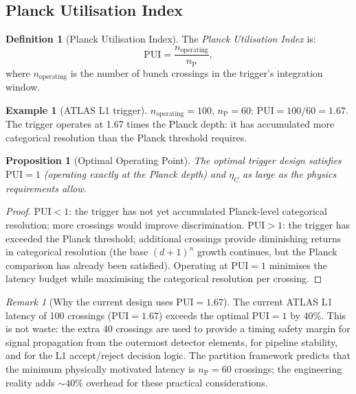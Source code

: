 \documentclass[twocolumn,10pt,a4paper]{article}
\theoremstyle{thmstyle}
\newtheorem{proposition}[theorem]{Proposition}
\theoremstyle{definition}
\newtheorem{definition}[theorem]{Definition}
\newtheorem{example}[theorem]{Example}
\theoremstyle{remark}
\newtheorem{remark}[theorem]{Remark}
\newcommand{\nP}{n_{\mathrm{P}}}
\newcommand{\etaC}{\eta_{C}}
\newcommand{\PUI}{\mathrm{PUI}}
\begin{document}
\subsection{Planck Utilisation Index}

\begin{definition}[Planck Utilisation Index]
\label{def:pui}
The \emph{Planck Utilisation Index} is:
\begin{equation}
\PUI = \frac{n_{\mathrm{operating}}}{\nP},
\label{eq:pui}
\end{equation}
where $n_{\mathrm{operating}}$ is the number of bunch crossings in the
trigger's integration window.
\end{definition}

\begin{example}[ATLAS L1 trigger]
$n_{\mathrm{operating}} = 100$, $\nP = 60$: $\PUI = 100/60 = 1.67$.
The trigger operates at 1.67 times the Planck depth: it has accumulated
more categorical resolution than the Planck threshold requires.
\end{example}

\begin{proposition}[Optimal Operating Point]
\label{prop:optimal}
The optimal trigger design satisfies $\PUI = 1$ (operating exactly at the
Planck depth) and $\etaC$ as large as the physics requirements allow.
\end{proposition}

\begin{proof}
$\PUI < 1$: the trigger has not yet accumulated Planck-level categorical
resolution; more crossings would improve discrimination.
$\PUI > 1$: the trigger has exceeded the Planck threshold; additional crossings
provide diminishing returns in categorical resolution (the base $(d+1)^n$
growth continues, but the Planck comparison has already been satisfied).
Operating at $\PUI = 1$ minimises the latency budget while maximising the
categorical resolution per crossing.
\end{proof}

\begin{remark}[Why the current design uses $\PUI = 1.67$]
The current ATLAS L1 latency of 100 crossings ($\PUI = 1.67$) exceeds the
optimal $\PUI = 1$ by 40\%. This is not waste: the extra 40 crossings are
used to provide a timing safety margin for signal propagation from the
outermost detector elements, for pipeline stability, and for the L1
accept/reject decision logic. The partition framework predicts that the
minimum physically motivated latency is $\nP = 60$ crossings; the engineering
reality adds $\sim 40\%$ overhead for these practical considerations.
\end{remark}
\end{document}
